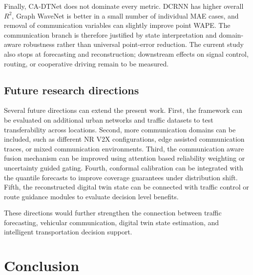 \documentclass[pdflatex,sn-mathphys-num]{sn-jnl}%
\newenvironment{changed}{\color{blue}}{}
\theoremstyle{thmstyleone}%
\theoremstyle{thmstyletwo}%
\theoremstyle{thmstylethree}%
\begin{document}
\begin{changed}
Finally, CA-DTNet does not dominate every metric. DCRNN has higher overall \(R^{2}\), Graph WaveNet is better in a small number of individual MAE cases, and removal of communication variables can slightly improve point WAPE. The communication branch is therefore justified by state interpretation and domain-aware robustness rather than universal point-error reduction. The current study also stops at forecasting and reconstruction; downstream effects on signal control, routing, or cooperative driving remain to be measured.
\end{changed}

\subsection{Future research directions}
\label{subsec:discussion_future_work}

Several future directions can extend the present work. First, the framework can be evaluated on additional urban networks and traffic datasets to test transferability across locations. Second, more communication domains can be included, such as different NR V2X configurations, edge assisted communication traces, or mixed communication environments. Third, the communication aware fusion mechanism can be improved using attention based reliability weighting or uncertainty guided gating. Fourth, conformal calibration can be integrated with the quantile forecasts to improve coverage guarantees under distribution shift. Fifth, the reconstructed digital twin state can be connected with traffic control or route guidance modules to evaluate decision level benefits.

These directions would further strengthen the connection between traffic forecasting, vehicular communication, digital twin state estimation, and intelligent transportation decision support.

\section{Conclusion}
\label{sec:conclusion}
\end{document}

